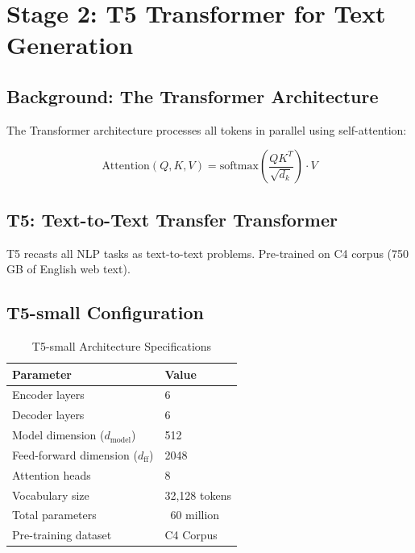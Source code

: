 \documentclass[12pt, a4paper]{report}
\begin{document}
\section{Stage 2: T5 Transformer for Text Generation}

\subsection{Background: The Transformer Architecture}

The Transformer architecture \cite{vaswani2017attention} processes all tokens in parallel using self-attention:

\begin{equation}
    \text{Attention}(Q, K, V) = \text{softmax}\left(\frac{QK^T}{\sqrt{d_k}}\right) \cdot V
\end{equation}

\subsection{T5: Text-to-Text Transfer Transformer}

T5 \cite{raffel2020t5} recasts all NLP tasks as text-to-text problems. Pre-trained on C4 corpus (750 GB of English web text).

\subsection{T5-small Configuration}

\begin{table}[H]
    \centering
    \caption{T5-small Architecture Specifications}
    \label{tab:t5_config}
    \begin{tabular}{@{}ll@{}}
        \toprule
        \textbf{Parameter} & \textbf{Value} \\
        \midrule
        Encoder layers & 6 \\
        Decoder layers & 6 \\
        Model dimension ($d_{\text{model}}$) & 512 \\
        Feed-forward dimension ($d_{\text{ff}}$) & 2048 \\
        Attention heads & 8 \\
        Vocabulary size & 32,128 tokens \\
        Total parameters & ~60 million \\
        Pre-training dataset & C4 Corpus \\
        \bottomrule
    \end{tabular}
\end{table}
\end{document}
